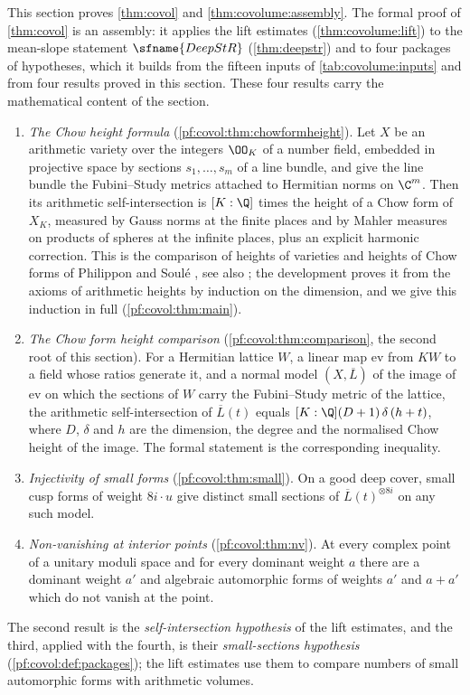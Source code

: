 This section proves \cref{thm:covol} and \cref{thm:covolume:assembly}. The formal proof of
\cref{thm:covol} is an assembly: it applies the lift estimates (\cref{thm:covolume:lift}) to the
mean-slope statement $\sfname{DeepStR}$ (\cref{thm:deepstr}) and to four packages of hypotheses, which
it builds from the fifteen inputs of \cref{tab:covolume:inputs} and from four results proved in this
section. These four results carry the mathematical content of the section.
\begin{enumerate}[label=(\arabic*)]
\item \emph{The Chow height formula} (\cref{pf:covol:thm:chowformheight}). Let $X$ be an arithmetic
  variety over the integers $\OO_K$ of a number field, embedded in projective space by sections
  $s_1,\dots,s_m$ of a line bundle, and give the line bundle the Fubini--Study metrics attached to
  Hermitian norms on $\C^m$. Then its arithmetic self-intersection is $[K:\Q]$ times the height of a
  Chow form of $X_K$, measured by Gauss norms at the finite places and by Mahler measures on products
  of spheres at the infinite places, plus an explicit harmonic correction. This is the comparison of
  heights of varieties and heights of Chow forms of Philippon and Soul\'e
  \cite{Philippon1991,Soule1991}, see also \cite[\S4.3]{BostGilletSoule1994}; the development proves
  it from the axioms of arithmetic heights by induction on the dimension, and we give this induction in
  full (\cref{pf:covol:thm:main}).
\item \emph{The Chow form height comparison} (\cref{pf:covol:thm:comparison}, the second root of this
  section). For a Hermitian lattice $W$, a linear map $\mathrm{ev}$ from $KW$ to a field whose ratios
  generate it, and a normal model $(X,\overline L)$ of the image of $\mathrm{ev}$ on which the sections
  of $W$ carry the Fubini--Study metric of the lattice, the arithmetic self-intersection of
  $\overline L(t)$ equals $[K:\Q](D+1)\,\delta\,(h+t)$, where $D$, $\delta$ and $h$ are the dimension,
  the degree and the normalised Chow height of the image. The formal statement is the corresponding
  inequality.
\item \emph{Injectivity of small forms} (\cref{pf:covol:thm:small}). On a good deep cover, small cusp
  forms of weight $8i\cdot u$ give distinct small sections of $\overline L(t)^{\otimes 8i}$ on any such
  model.
\item \emph{Non-vanishing at interior points} (\cref{pf:covol:thm:nv}). At every complex point of a
  unitary moduli space and for every dominant weight $a$ there are a dominant weight $a'$ and
  algebraic automorphic forms of weights $a'$ and $a+a'$ which do not vanish at the point.
\end{enumerate}
The second result is the \emph{self-intersection hypothesis} of the lift estimates, and the third,
applied with the fourth, is their \emph{small-sections hypothesis} (\cref{pf:covol:def:packages}); the lift
estimates use them to compare numbers of small automorphic forms with arithmetic volumes.

